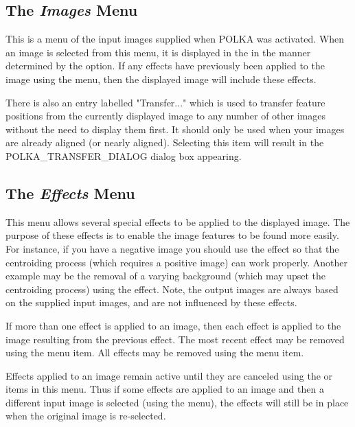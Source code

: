 \subsection {The {\em Images} Menu}
This is a menu of the input images supplied when POLKA was
activated. When an image is selected from this menu, it is displayed in
the  in the manner
determined by the  option. If any
effects have previously been applied to the image using the  menu, then the displayed image will
include these effects.

There is also an entry labelled "Transfer..." which is used to transfer
feature positions from the currently displayed image to any number of
other images without the need to display them first. It should only be
used when your images are already aligned (or nearly aligned). Selecting
this item will result in the 
{POLKA_TRANSFER_DIALOG} dialog box appearing.

\subsection {The {\em Effects} Menu}
This menu allows several special effects to be applied to the displayed
image. The purpose of these effects is to enable the image features to be
found more easily. For instance, if you have a negative image you should
use the  effect so that the
centroiding process (which requires a positive image) can work properly.
Another example may be the removal of a varying background (which may upset
the centroiding process) using the
 effect. Note, the output
images are always based on the supplied input images, and are not
influenced by these effects.

If more than one effect is applied to an image, then each effect is
applied to the image resulting from the previous effect. The most recent
effect may be removed using the 
menu item. All effects may be removed using the  menu item.

Effects applied to an image remain active until they are canceled using
the  or
 items in this menu. Thus
if some effects are applied to an image and then a different input image 
is selected (using the  menu), 
the effects will still be in place when the original image is re-selected.

